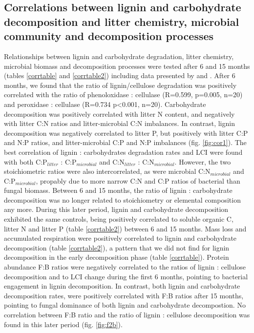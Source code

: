 \subsection*{Correlations between lignin and carbohydrate decomposition and litter chemistry, microbial community and decomposition processes}

Relationships between lignin and carbohydrate degradation, litter chemistry, microbial biomass and decomposition processes were tested after 6 and 15 months (tables \ref{corrtable} and \ref{corrtable2}) including data presented by \cite{Mooshammer2011} and \cite{Leitner2011}. After 6 months, we found that the ratio of lignin/cellulose degradation was positively correlated with the ratio of phenoloxidase : cellulase (R=0.599, p=0.005, n=20) and peroxidase : cellulase (R=0.734 p\textless 0.001, n=20). Carbohydrate decomposition was positively correlated with litter N content, and negatively with litter C:N ratios and litter-microbial C:N imbalances. In contrast, lignin decomposition was negatively correlated to litter P, but positively with litter C:P and N:P ratios, and litter-microbial C:P and N:P imbalances (fig. \ref{fig:cor1}). The best correlation of lignin : carbohydrates degradation rates and LCI were found with both C:P$_{litter}$ : C:P$_{microbial}$ and C:N$_{litter}$ : C:N$_{microbial}$. However, the two 
stoichiometric ratios were also intercorrelated, as were microbial C:N$_{microbial}$ and C:P$_{microbial}$, propably due to more narrow C:N and C:P ratios of bacterial than fungal biomass. Between 6 and 15 months, the ratio of lignin : carbohydrate decomposition was no longer related to stoichiometry or elemental composition any more. During this later period, lignin and carbohydrate decomposition exhibited the same controls, being positively correlated to soluble organic C, litter N and litter P (table \ref{corrtable2}) between 6 and 15 months. Mass loss and accumulated respiration were positively correlated to lignin and carbohydrate decomposition (table \ref{corrtable2}), a pattern that we did not find for lignin decomposition in the early decomposition phase (table \ref{corrtable}). Protein abundance F:B ratios were negatively correlated to the ratios of lignin : cellulose decomposition and to LCI change during the first 6 months, pointing to bacterial engagement in lignin decomposition. In contrast,
 both lignin and carbohydrate decomposition rates, were positively correlated with F:B ratios after 15 months, pointing to fungal dominance of both lignin and carbohydrate decompostion. No correlation between F:B ratio and the ratio of lignin : cellulose decomposition was found in this later period (fig. \ref{fig:f2b}).

